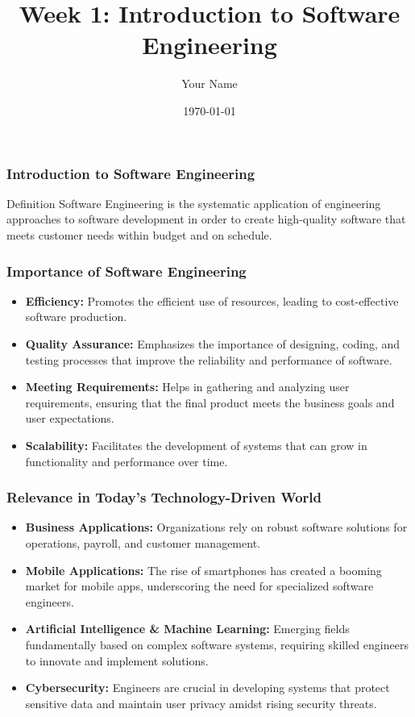 \documentclass{beamer}
\title{Week 1: Introduction to Software Engineering}
\author{Your Name}
\institute{Your Institution}
\date{\today}
\begin{document}
\frame{\titlepage}

\begin{frame}[fragile]
    \frametitle{Introduction to Software Engineering}
    \begin{block}{Definition}
        Software Engineering is the systematic application of engineering approaches to software development in order to create high-quality software that meets customer needs within budget and on schedule.
    \end{block}
\end{frame}

\begin{frame}[fragile]
    \frametitle{Importance of Software Engineering}
    \begin{itemize}
        \item \textbf{Efficiency:} Promotes the efficient use of resources, leading to cost-effective software production.
        \item \textbf{Quality Assurance:} Emphasizes the importance of designing, coding, and testing processes that improve the reliability and performance of software.
        \item \textbf{Meeting Requirements:} Helps in gathering and analyzing user requirements, ensuring that the final product meets the business goals and user expectations.
        \item \textbf{Scalability:} Facilitates the development of systems that can grow in functionality and performance over time.
    \end{itemize}
\end{frame}

\begin{frame}[fragile]
    \frametitle{Relevance in Today’s Technology-Driven World}
    \begin{itemize}
        \item \textbf{Business Applications:} Organizations rely on robust software solutions for operations, payroll, and customer management.
        \item \textbf{Mobile Applications:} The rise of smartphones has created a booming market for mobile apps, underscoring the need for specialized software engineers.
        \item \textbf{Artificial Intelligence \& Machine Learning:} Emerging fields fundamentally based on complex software systems, requiring skilled engineers to innovate and implement solutions.
        \item \textbf{Cybersecurity:} Engineers are crucial in developing systems that protect sensitive data and maintain user privacy amidst rising security threats.
    \end{itemize}
\end{frame}
\end{document}
